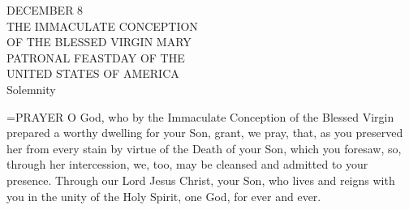 \begin{center}\normalsize DECEMBER 8\\
\footnotesize THE IMMACULATE CONCEPTION\\
\footnotesize OF THE BLESSED VIRGIN MARY\\
\footnotesize PATRONAL FEASTDAY OF THE\\
\footnotesize UNITED STATES OF AMERICA\\
\footnotesize Solemnity\\
\end{center}

\hangindent=\parindent \small{PRAYER 
O God, who by the Immaculate Conception of the Blessed Virgin
prepared a worthy dwelling for your Son,
grant, we pray,
that, as you preserved her from every stain
by virtue of the Death of your Son, which you foresaw,
so, through her intercession,
we, too, may be cleansed and admitted to your presence.
Through our Lord Jesus Christ, your Son,
who lives and reigns with you in the unity of the Holy Spirit,
one God, for ever and ever.\\}
 
